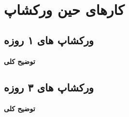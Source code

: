 \chapter{کارهای حین ورکشاپ}

\section{ورکشاپ های ۱ روزه}

\subsubsection{توضیح کلی}




\section{ورکشاپ های ۳ روزه}

\subsubsection{توضیح کلی}


